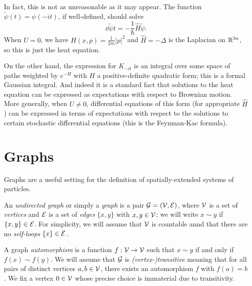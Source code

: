 \begin{rk}
In fact, this is not as unreasonable as it may appear. The function
$\tilde\psi(t) = \psi(-i t)$, if well-defined, should solve
\begin{equation}
\dd{\tilde\psi}{t} = -\frac{1}{\hbar} \hat H \tilde\psi.
\end{equation}
When $U = 0$, we have $H(x, p) = \frac{1}{2m} |p|^2$ and $\hat H = -\Delta$
is the Laplacian on ${\mathbb R}^{3n}$, so this is just the heat equation.

On the other hand, the expression for $K_{-it}$ is an integral over some
space of paths weighted by $e^{-H}$ with $H$ a positive-definite quadratic form;
this is a formal Gaussian integral. And indeed it is a standard fact that
solutions to the heat equation can be expressed as expectations with respect to
Brownian motion. More generally, when $U \ne 0$, differential equations of this
form (for appropriate
$\hat H$) can be expressed in terms of expectations with respect to the solutions
to certain stochastic differential equations (this is the Feynman-Kac formula).
\end{rk}


\section{Graphs}
\label{sec:graphs}

Graphs are a useful setting for the definition of spatially-extended systems of
particles.

An \emph{undirected graph} or simply a \emph{graph} is a pair $\mathcal{G} = (\mathcal{V}, \mathcal{E})$,
where $\mathcal{V}$
is a set of \emph{vertices} and $\mathcal{E}$ is a set of
\emph{edges} $\{ x, y \}$ with $x, y \in \mathcal{V}$; we will write $x \sim y$ if
$\{ x, y \} \in \mathcal{E}$.
For simplicity, we will assume that $\mathcal{V}$ is countable annd that there are no
\emph{self-loops} $\{ x \} \in \mathcal{E}$.

A graph \emph{automorphism} is a function $f : \mathcal{V}\rightarrow\mathcal{V}$ such that
$x \sim y$ if and only if $f(x) \sim f(y)$.
We will assume that $\mathcal{G}$ is \emph{(vertex-)transitive} meaning that for all pairs
of distinct
vertices $a, b \in \mathcal{V}$, there exists an automorphism $f$ with $f(a) = b$.
We fix a vertex $0\in\mathcal{V}$ whose precise choice is immaterial due to
transitivity.

